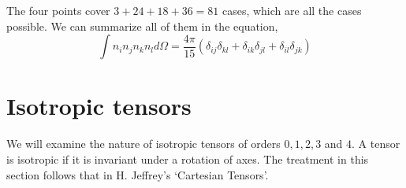 The four points cover $3 + 24 + 18 + 36 = 81$ cases, which are all the cases possible. We can summarize all of them in the equation,
\begin{equation}\label{c3sae2}
\int n_i n_j n_k n_l d\Omega = \frac{4\pi}{15}(\delta_{ij}\delta_{kl}+\delta_{ik}\delta_{jl}+\delta_{il}\delta_{jk})
\end{equation}

\section{Isotropic tensors}\label{mr12}
We will examine the nature of isotropic tensors of orders $0, 1, 2, 3$ and $4$. A tensor is isotropic if it is invariant under a rotation of axes. The treatment in this section follows
that in H. Jeffrey's \enquote*{Cartesian Tensors}\cite{jeffreys1961cartesian}.

